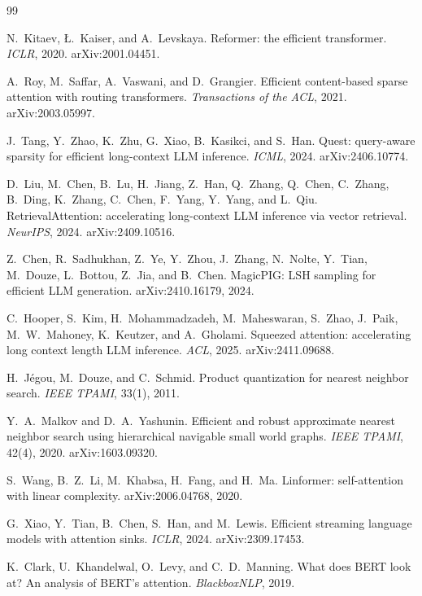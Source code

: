 \documentclass[11pt]{article}
\begin{document}
\begin{thebibliography}{99}\small

N.~Kitaev, \L.~Kaiser, and A.~Levskaya.
Reformer: the efficient transformer.
\emph{ICLR}, 2020. arXiv:2001.04451.

A.~Roy, M.~Saffar, A.~Vaswani, and D.~Grangier.
Efficient content-based sparse attention with routing
transformers.
\emph{Transactions of the ACL}, 2021. arXiv:2003.05997.

J.~Tang, Y.~Zhao, K.~Zhu, G.~Xiao, B.~Kasikci, and S.~Han.
Quest: query-aware sparsity for efficient long-context LLM
inference.
\emph{ICML}, 2024. arXiv:2406.10774.

D.~Liu, M.~Chen, B.~Lu, H.~Jiang, Z.~Han, Q.~Zhang, Q.~Chen,
C.~Zhang, B.~Ding, K.~Zhang, C.~Chen, F.~Yang, Y.~Yang, and
L.~Qiu.
RetrievalAttention: accelerating long-context LLM inference via
vector retrieval.
\emph{NeurIPS}, 2024. arXiv:2409.10516.

Z.~Chen, R.~Sadhukhan, Z.~Ye, Y.~Zhou, J.~Zhang, N.~Nolte,
Y.~Tian, M.~Douze, L.~Bottou, Z.~Jia, and B.~Chen.
MagicPIG: LSH sampling for efficient LLM generation.
arXiv:2410.16179, 2024.

C.~Hooper, S.~Kim, H.~Mohammadzadeh, M.~Maheswaran, S.~Zhao,
J.~Paik, M.~W.~Mahoney, K.~Keutzer, and A.~Gholami.
Squeezed attention: accelerating long context length LLM
inference.
\emph{ACL}, 2025. arXiv:2411.09688.

H.~J\'egou, M.~Douze, and C.~Schmid.
Product quantization for nearest neighbor search.
\emph{IEEE TPAMI}, 33(1), 2011.

Y.~A.~Malkov and D.~A.~Yashunin.
Efficient and robust approximate nearest neighbor search using
hierarchical navigable small world graphs.
\emph{IEEE TPAMI}, 42(4), 2020. arXiv:1603.09320.

S.~Wang, B.~Z.~Li, M.~Khabsa, H.~Fang, and H.~Ma.
Linformer: self-attention with linear complexity.
arXiv:2006.04768, 2020.

G.~Xiao, Y.~Tian, B.~Chen, S.~Han, and M.~Lewis.
Efficient streaming language models with attention sinks.
\emph{ICLR}, 2024. arXiv:2309.17453.

K.~Clark, U.~Khandelwal, O.~Levy, and C.~D.~Manning.
What does BERT look at? An analysis of BERT's attention.
\emph{BlackboxNLP}, 2019.


\end{thebibliography}
\end{document}
